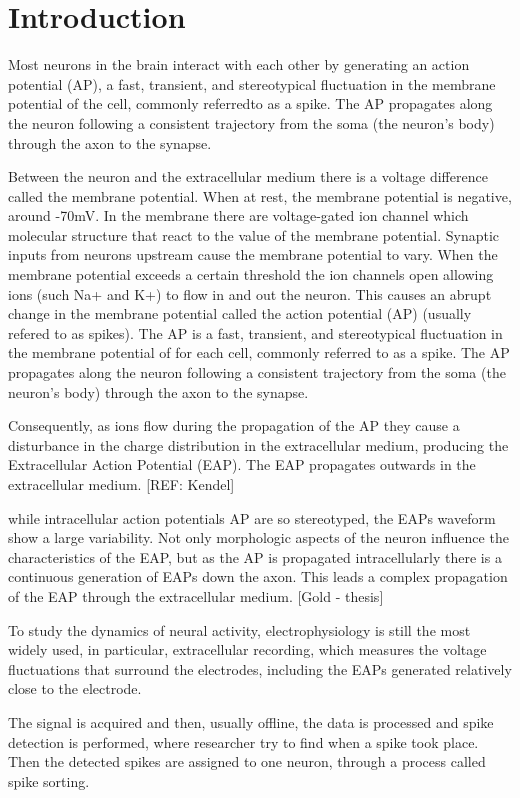 \documentclass{article}
\begin{document}
\section{Introduction}
\label{sec:introduction}
Most neurons in the brain interact with each other by generating an action potential (AP), a fast,
transient, and stereotypical fluctuation in the membrane potential of the cell, commonly referredto as a spike. The AP propagates along the neuron following a consistent trajectory from the soma (the neuron's body) through the axon to the synapse. 

Between the neuron and the extracellular medium there is a voltage difference called the membrane potential. When at rest, the membrane potential is negative, around -70mV.  In the membrane there are voltage-gated ion channel which molecular structure that react to the value of the membrane potential. Synaptic inputs from neurons upstream cause the membrane potential to vary. When the membrane potential exceeds a certain threshold the ion channels open allowing ions (such Na+ and K+) to flow in and out the neuron. This causes an abrupt change in the membrane potential called the action potential (AP) (usually refered to as spikes). The AP is a fast, transient, and stereotypical fluctuation in the membrane potential of for each cell, commonly referred to as a spike. The AP propagates along the neuron following a consistent trajectory from the soma (the neuron's body) through the axon to the synapse. 

Consequently, as ions flow during the propagation of the AP they cause a disturbance in the charge distribution in the extracellular medium, producing the Extracellular Action Potential (EAP). The EAP propagates outwards in the extracellular medium. [REF: Kendel]

while intracellular action potentials AP are so stereotyped, the EAPs waveform show a large variability. Not only morphologic aspects of the neuron influence the characteristics of the EAP, but as the AP is propagated intracellularly there is a continuous generation of EAPs  down the axon. This leads a complex propagation of the EAP through the extracellular medium. [Gold -  thesis]
 
To study the dynamics of neural activity, electrophysiology is still the most widely used, in particular, extracellular recording, which measures the voltage fluctuations that surround the electrodes, including the EAPs generated relatively close to the electrode.
 
The signal is acquired and then, usually offline, the data is processed and spike detection is performed, where researcher try to find when a spike took place. Then the detected spikes are assigned to one neuron, through a process called spike sorting.
\end{document}
